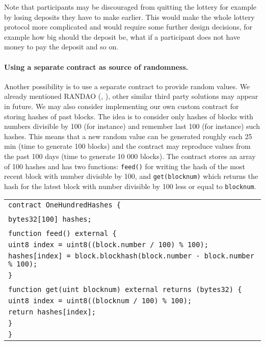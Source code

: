 \documentclass[a4paper]{article}
\begin{document}
    Note that participants may be discouraged from quitting the lottery for example by losing deposits they have to
    make earlier. This would make the whole lottery protocol more complicated and would require some further design
    decisions, for example how big should the deposit be, what if a participant does not have money to pay the deposit
    and so on.

    \paragraph{Using a separate contract as source of randomness.}
    Another possibility is to use a separate contract to provide random values. We already mentioned RANDAO
    (\cite{RANDAO}, \cite{RANDAO2}), other similar third party solutions may appear in future.
    We may also consider implementing our own custom contract for storing hashes of past blocks.
    The idea is to consider only hashes of blocks with numbers divisible by 100 (for instance) and remember last 100
    (for instance) such hashes. This means that a new random value can be generated roughly each 25 min
    (time to generate 100 blocks) and the contract may reproduce values from the past 100 days
    (time to generate 10 000 blocks). The contract stores an array of 100 hashes and has two functions:
    \texttt{feed()} for writing the hash of the most recent block with number divisible by 100, and
    \texttt{get(blocknum)} which returns the hash for the latest block with number divisible by 100 less or
    equal to \texttt{blocknum}.

    \label{sec:hundred}

    \begin{tabular}{l}
        \texttt{contract OneHundredHashes \{}\\
        \\
	    \qquad \texttt{bytes32[100] hashes;}\\
        \\
	    \qquad\texttt{function feed() external \{}\\
    	\qquad\qquad \texttt{uint8 index = uint8((block.number / 100) \% 100);}\\
    	\qquad\qquad \texttt{hashes[index] = block.blockhash(block.number - block.number \% 100);}\\
	    \qquad\texttt{\}}\\
        \\
	    \qquad \texttt{function get(uint blocknum) external returns (bytes32) \{}\\
        \qquad\qquad \texttt{uint8 index = uint8((blocknum / 100) \% 100);}\\
    	\qquad\qquad \texttt{return hashes[index];}\\
	    \qquad\texttt{\}}\\
    \texttt{\}}
    \end{tabular}
\end{document}
